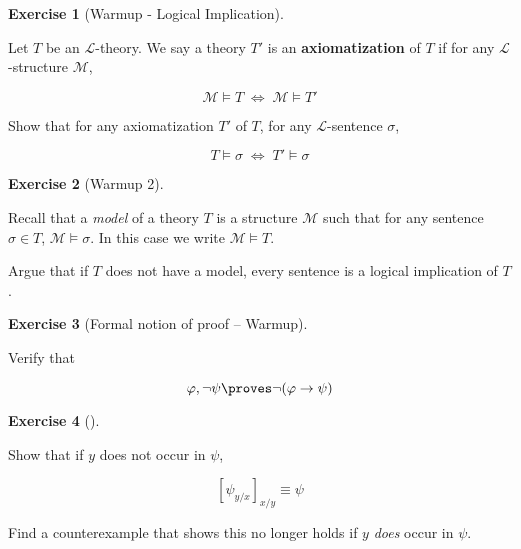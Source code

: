 \documentclass[
]{article}
\theoremstyle{definition}
\newtheorem{exercise}{Exercise}[section]
\theoremstyle{remark}
\begin{document}
\begin{exercise}[Warmup - Logical
Implication]\protect\hypertarget{exr-}{}\label{exr-}

\hfill\break
Let \(T\) be an \(\mathcal{L}\)-theory. We say a theory \(T'\) is an
\textbf{axiomatization} of \(T\) if for any \(\mathcal{L}\)-structure
\(\mathcal{M}\),

\[\mathcal{M} \models T \; \iff \; \mathcal{M} \models T'\]

Show that for any axiomatization \(T'\) of \(T\), for any
\(\mathcal{L}\)-sentence \(\sigma\),

\[T \models \sigma \; \iff \; T' \models \sigma\]

\end{exercise}

\begin{exercise}[Warmup 2]\protect\hypertarget{exr-}{}\label{exr-}

\hfill\break
Recall that a \emph{model} of a theory \(T\) is a structure
\(\mathcal{M}\) such that for any sentence \(\sigma \in T\),
\(\mathcal{M} \models \sigma\). In this case we write
\(\mathcal{M} \models T\).

Argue that if \(T\) does not have a model, every sentence is a logical
implication of \(T\).

\end{exercise}

\begin{exercise}[Formal notion of proof --
Warmup]\protect\hypertarget{exr-}{}\label{exr-}

\hfill\break
Verify that

\[\varphi, \neg \psi \proves \neg(\varphi \to \psi)\]

\end{exercise}

\begin{exercise}[]\protect\hypertarget{exr-}{}\label{exr-}

\hfill\break
Show that if \(y\) does not occur in \(\psi\),

\[
[\psi_{y/x}]_{x/y} \equiv \psi
\]

Find a counterexample that shows this no longer holds if \(y\)
\emph{does} occur in \(\psi\).

\end{exercise}
\end{document}

